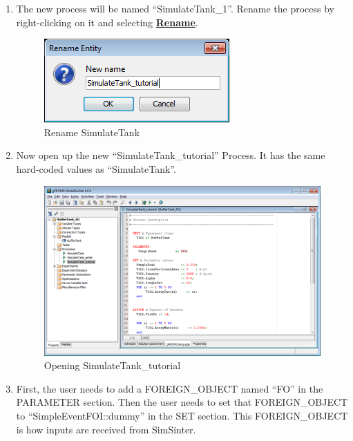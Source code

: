 \begin{enumerate}
\item The new process will be named ``SimulateTank\_1''.  Rename the process by right-clicking on it and selecting \textbf{\underline{Rename}}.

\begin{figure}[H]
	\begin{center}
		\includegraphics[scale=0.55]{Chapt_sinter/figs/gPROMS/06_EditBufferTank}
		\caption{Rename SimulateTank}
		\label{fig.sinter.gproms.renamesimulatetank}
	\end{center}
\end{figure}

\item Now open up the new ``SimulateTank\_tutorial'' Process.  It has the same hard-coded values as ``SimulateTank''.

\begin{figure}[H]
	\begin{center}
		\includegraphics[scale=0.55]{Chapt_sinter/figs/gPROMS/07_EditBufferTank}
		\caption{Opening SimulateTank\_tutorial}
		\label{fig.sinter.gproms.opensimulatetank_tutorial}
	\end{center}
\end{figure}


\item First, the user needs to add a FOREIGN\_OBJECT named ``FO'' in the PARAMETER section.
Then the user needs to set that FOREIGN\_OBJECT to ``SimpleEventFOI::dummy'' in the SET section.
This FOREIGN\_OBJECT is how inputs are received from SimSinter.


\end{enumerate}
